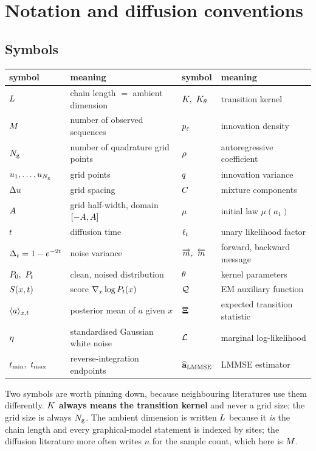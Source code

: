 \section{Notation and diffusion conventions}
\label{app:notation}

\subsection{Symbols}

\begin{center}
\small
\begin{tabular}{ll@{\qquad}ll}
\toprule
symbol & meaning & symbol & meaning \\
\midrule
$L$ & chain length $=$ ambient dimension & $\kernel,\ \kernelth$ & transition kernel \\
$M$ & number of observed sequences & $p_{\varepsilon}$ & innovation density \\
$N_{\mathrm{g}}$ & number of quadrature grid points & $\rho$ & autoregressive coefficient \\
$u_{1},\dots,u_{N_{\mathrm{g}}}$ & grid points & $q$ & innovation variance \\
$\Delta u$ & grid spacing & $C$ & mixture components \\
$A$ & grid half-width, domain $[-A,A]$ & $\mu$ & initial law $\mu(a_1)$ \\
$t$ & diffusion time & $\ell_t$ & unary likelihood factor \\
$\Delta_t = 1-e^{-2t}$ & noise variance & $\lmsg,\ \rmsg$ & forward, backward message \\
$\Pz,\ \Pt$ & clean, noised distribution & $\theta$ & kernel parameters \\
$S(x,t)$ & score $\nabla_x\log P_t(x)$ & $\mathcal{Q}$ & EM auxiliary function \\
$\langle a \rangle_{x,t}$ & posterior mean of $a$ given $x$ & $\mathbf{\Xi}$ & expected transition statistic \\
$\mathbf{\eta}$ & standardised Gaussian white noise & $\mathcal{L}$ & marginal log-likelihood \\
$\tmin,\ \tmax$ & reverse-integration endpoints & $\widehat{\mathbf{a}}_{\mathrm{LMMSE}}$ & LMMSE estimator \\
\bottomrule
\end{tabular}
\end{center}

Two symbols are worth pinning down, because neighbouring literatures use them differently.
\textbf{$K$ always means the transition kernel} and never a grid size; the grid size is
always $N_{\mathrm{g}}$. The ambient dimension is written $L$ because it \emph{is} the chain length
and every graphical-model statement is indexed by sites; the diffusion literature more often
writes $n$ for the sample count, which here is $M$.

